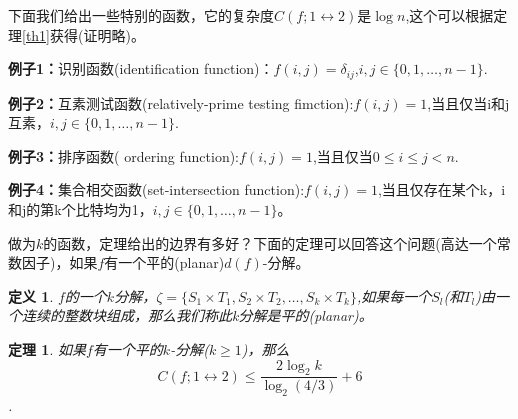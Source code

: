 \documentclass[]{article}
\newtheorem{theorem}{定理}
\newtheorem{definition}{定义}
\begin{document}
	下面我们给出一些特别的函数，它的复杂度$ C(f;1\leftrightarrow 2)$是$\log n$,这个可以根据定理\ref{th1}获得(证明略)。\par
	
	\textbf{例子1：}识别函数(identification function)：$f(i,j)=\delta_{ij}$,$i,j\in \{0,1,\ldots,n-1\}$.\par
	
	\textbf{例子2：}互素测试函数(relatively-prime testing fimction):$f(i,j)=1$,当且仅当i和j互素，$i,j\in \{0,1,\ldots,n-1\}$.\par
	
	\textbf{例子3：}排序函数( ordering function):$f(i,j)=1$,当且仅当$0\leq i \leq j < n$.\par
	
	\textbf{例子4：}集合相交函数(set-intersection function):$f(i,j)=1$,当且仅存在某个k，i和j的第k个比特均为1，$i,j\in \{0,1,\ldots,n-1\}$。\par
	
	做为$k$的函数，定理给出的边界有多好？下面的定理可以回答这个问题(高达一个常数因子)，如果$f$有一个平的(planar)$d(f)$-分解。\par
	
	\begin{definition}
		$f$的一个$k$分解，$\zeta=\{S_1\times T_1,S_2\times T_2,\ldots,S_k\times T_k \}$,如果每一个$S_l$(和$T_l$)由一个连续的整数块组成，那么我们称此k分解是平的(planar)。
	\end{definition}

	\begin{theorem}
		如果$f$有一个平的$k$-分解($k\geq 1$)，那么
		\[C(f;1\leftrightarrow 2)\leq \dfrac{2\log_2 k}{\log_2(4/3)}  +6 \].
	\end{theorem}
	
\end{document}

